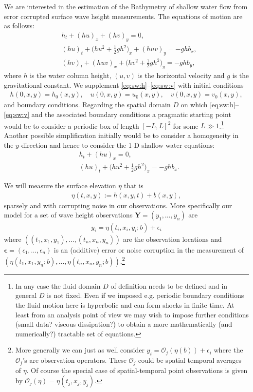\documentclass[18pt]{article}
\numberwithin{equation}{subsection}
\newcommand{\beps}{\boldsymbol{\epsilon}}
\newcommand{\Obs}{\mathcal{O}}
\newcommand{\bfY}{\mathbf{Y}}
\begin{document}
We are interested in the estimation of the Bathymetry of shallow water flow from error corrupted surface wave height measurements. 
The equations of motion are as follows:
\begin{align}
    &h_t + (hu)_x + (hv)_y = 0,
    \label{eq:sw:h}\\
   &(hu)_t + \bigl(hu^2 + \tfrac{1}{2}gh^2\bigr)_{\!x} + (huv)_y = -ghb_x,
    \label{eq:sw:u}\\
   &(hv)_t + (huv)_x + \bigl(hv^2 + \tfrac{1}{2}gh^2\bigr)_{\!y} = -ghb_y,
   \label{eq:sw:v}
\end{align}
where $h$ is the water column height, $(u,v)$ is the horizontal velocity and $g$ is the 
gravitational constant.  We supplement \eqref{eq:sw:h}--\eqref{eq:sw:v} with
initial conditions 
\begin{align}
	h(0,x,y) = h_0(x,y), \quad u(0,x,y) = u_0(x,y), \quad v(0,x,y) = v_0(x,y),
\end{align}
and boundary conditions.  Regarding the spatial domain $D$ on which \eqref{eq:sw:h}--\eqref{eq:sw:v} and the associated boundary 
conditions a pragmatic starting point would be to consider a periodic box of length $[-L,L]^2$ for some 
$L \gg 1$.\footnote{In any case the fluid domain $D$ of definition needs to be defined and in general $D$ is not fixed. Even if
we imposed e.g. periodic boundary conditions the fluid motion here is hyperbolic and can form
shocks in finite time.   At least from an analysis point of view we may wish to 
impose further conditions (small data? viscous dissipation?) to obtain a more mathematically (and numerically?) tractable set 
of equations.}   Another possible simplification initially would be to consider a homogeneity in the $y$-direction and hence
to consider the 1-D shallow water equations:
\begin{align}
    &h_t + (hu)_x= 0,
    \label{eq:sw:1d:h}\\
   &(hu)_t + \bigl(hu^2 + \tfrac{1}{2}gh^2\bigr)_{\!x}  = -ghb_x.
    \label{eq:sw:1d:u}
\end{align}


We will measure the surface elevation $\eta$ that is
\begin{align}
	\eta(t,x,y) :=  h(x,y,t)+b(x,y),
\end{align}
sparsely and with corrupting noise in our observations.  More specifically our model for a set of wave height observations
$\bfY= (y_1, …, y_n)$ are 
\begin{align}
\label{eq:obs:proceedure}
y_i = \eta(t_i, x_i, y_i; b) + \epsilon_i
\end{align}
where $((t_1, x_1, y_1),\ldots, (t_n, x_n, y_n))$ are the observation locations and $\beps = (\epsilon_1, \ldots, \epsilon_n)$ is an (additive) error or noise
corruption in the measurement of $(\eta(t_1, x_1, y_n; b), \ldots,  \eta(t_n, x_n, y_n; b))$.\footnote{More generally we can just as well consider $y_i = \Obs_j(\eta(b)) + \epsilon_i$ where the $\Obs_j$'s are observation
operators.  These $\Obs_j$ could be spatial temporal averages of $\eta$.  Of course the special case of spatial-temporal point observations is given by $\Obs_j(\eta) = \eta(t_j, x_j, y_j)$.}
\end{document}
